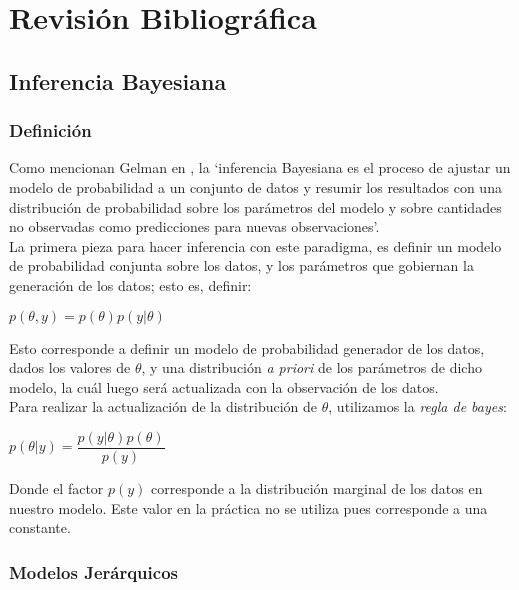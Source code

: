 \chapter{Revisión Bibliográfica}

\section {Inferencia Bayesiana}

\subsection{Definición}
Como mencionan Gelman en \cite{gelman2013bayesian}, la `inferencia Bayesiana es el proceso de ajustar un modelo de probabilidad a un conjunto de datos y resumir los resultados con una distribución de probabilidad sobre los parámetros del modelo y sobre cantidades no observadas como predicciones para nuevas observaciones'.\\

La primera pieza para hacer inferencia con este paradigma, es definir un modelo de probabilidad conjunta sobre los datos, y los parámetros que gobiernan la generación de los datos; esto es, definir:

\begin{center}
    $p(\theta, y) = p(\theta)p(y|\theta)$
\end{center}

Esto corresponde a definir un modelo de probabilidad generador de los datos, dados los valores de $\theta$, y una distribución \textit{a priori} de los parámetros de dicho modelo, la cuál luego será actualizada con la observación de los datos.\\

Para realizar la actualización de la distribución de $\theta$, utilizamos la \textit{regla de bayes}:

\begin{center}
    $p(\theta | y) = \dfrac{p(y|\theta)p(\theta)}{p(y)}$
\end{center}

Donde el factor $p(y)$ corresponde a la distribución marginal de los datos en nuestro modelo. Este valor en la práctica no se utiliza pues corresponde a una constante.\\

\subsection{Modelos Jerárquicos}

